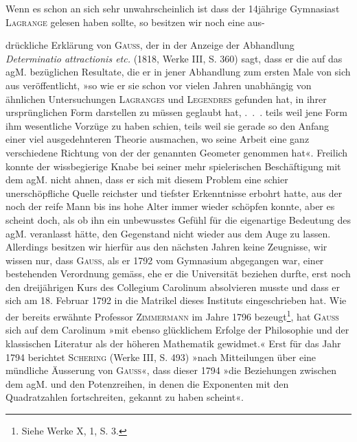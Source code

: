 Wenn es schon an sich sehr unwahrscheinlich ist dass der 14jährige
Gymnasiast \textsc{Lagrange} gelesen haben sollte, so besitzen wir noch eine aus-\par
\clearpage{}
\noindent drückliche Erklärung von \textsc{Gauss}, der in der Anzeige der Abhandlung \textit{Determinatio attractionis etc.}
(1818, Werke III, S. 360) sagt, dass er die auf das
agM. bezüglichen Resultate, die er in jener Abhandlung zum ersten Male
von sich aus veröffentlicht, »so wie er sie schon vor vielen Jahren unabhängig
von ähnlichen Untersuchungen \textsc{Lagranges} und \textsc{Legendres} gefunden
hat, in ihrer ursprünglichen Form darstellen zu müssen geglaubt hat, .\ .\ . teils
weil jene Form ihm wesentliche Vorzüge zu haben schien, teils weil sie gerade
so den Anfang einer viel ausgedehnteren Theorie ausmachen, wo seine
Arbeit eine ganz verschiedene Richtung von der der genannten Geometer genommen
hat«. Freilich konnte der wissbegierige Knabe bei seiner mehr
spielerischen Beschäftigung mit dem agM. nicht ahnen, dass er sich mit diesem
Problem eine schier unerschöpfliche Quelle reichster und tiefster Erkenntnisse
erbohrt hatte, aus der noch der reife Mann bis ins hohe Alter immer wieder
schöpfen konnte, aber es scheint doch, als ob ihn ein unbewusstes Gefühl
für die eigenartige Bedeutung des agM. veranlasst hätte, den Gegenstand nicht
wieder aus dem Auge zu lassen. Allerdings besitzen wir hierfür aus den
nächsten Jahren keine Zeugnisse, wir wissen nur, dass \textsc{Gauss}, als er 1792
vom Gymnasium abgegangen war, einer bestehenden Verordnung gemäss, ehe
er die Universität beziehen durfte, erst noch den dreijährigen Kurs des Collegium
Carolinum absolvieren musste und dass er sich am 18. Februar 1792
in die Matrikel dieses Instituts eingeschrieben hat. Wie der bereits erwähnte
Professor \textsc{Zimmermann} im Jahre 1796 bezeugt\footnote{Siehe Werke X, 1, S. 3.}, hat \textsc{Gauss} sich auf dem Carolinum
»mit ebenso glücklichem Erfolge der Philosophie und der klassischen
Literatur als der höheren Mathematik gewidmet.« Erst für das Jahr 1794
berichtet \textsc{Schering} (Werke III, S. 493) »nach Mitteilungen über eine mündliche
Äusserung von \textsc{Gauss}«, dass dieser 1794 »die Beziehungen zwischen dem
agM. und den Potenzreihen, in denen die Exponenten mit den Quadratzahlen
fortschreiten, gekannt zu haben scheint«.

